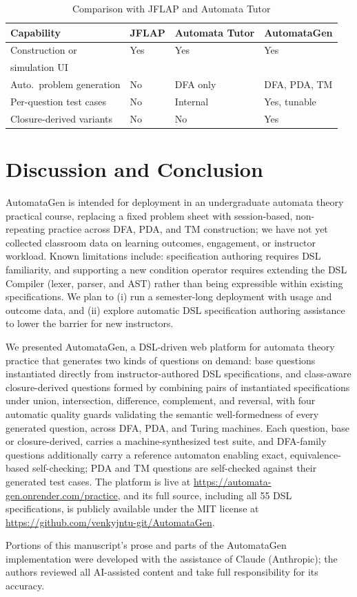 \documentclass[sigconf]{acmart}
\begin{document}
\begin{table}[t]
  \caption{Comparison with JFLAP and Automata Tutor}
  \label{tab:compare}
  \small
  \setlength{\tabcolsep}{3pt}
  \begin{tabular}{p{2.05cm}p{1.25cm}p{1.65cm}p{1.4cm}}
    \toprule
    \textbf{Capability} & \textbf{JFLAP} & \textbf{Automata Tutor} & \textbf{AutomataGen}\\
    \midrule
    Construction or  & Yes & Yes & Yes\\
    simulation UI     &    &     &    \\
    Auto.\ problem generation & No & DFA only & DFA, PDA, TM\\
    Per-question test cases & No & Internal & Yes, tunable\\
    Closure-derived variants & No & No & Yes\\
    \bottomrule
  \end{tabular}
\end{table}

\section{Discussion and Conclusion}
AutomataGen is intended for deployment in an undergraduate automata theory practical course, 
replacing a fixed problem sheet with session-based, non-repeating practice across DFA, PDA, and TM construction; 
we have not yet collected classroom data on learning outcomes, engagement, or instructor workload. 
Known limitations include: specification authoring requires DSL familiarity, and supporting a new condition operator requires extending the DSL Compiler (lexer, parser, and AST) rather than being expressible within existing specifications. We plan to (i) run a semester-long deployment with usage and outcome data, and (ii) explore automatic DSL specification authoring assistance to lower the barrier for new instructors.

We presented AutomataGen, a DSL-driven web platform for automata theory practice that generates 
two kinds of questions on demand: base questions instantiated directly from instructor-authored DSL specifications, 
and class-aware closure-derived questions formed by combining pairs of instantiated specifications under union, intersection, difference, complement, and reversal, with four automatic quality guards validating the semantic well-formedness of every generated question, across DFA, PDA, and Turing machines. 
Each question, base or closure-derived, carries a machine-synthesized test suite, and DFA-family questions additionally carry a reference automaton enabling exact, equivalence-based self-checking; PDA and TM questions are self-checked against their generated test cases. The platform is live at \url{https://automata-gen.onrender.com/practice}, 
and its full source, including all 55 DSL specifications, is publicly available under the MIT license at \url{https://github.com/venkyjntu-git/AutomataGen}.

\begin{acks}
Portions of this manuscript's prose and parts of the AutomataGen implementation were developed with the assistance of Claude (Anthropic); the authors reviewed all AI-assisted content and take full responsibility for its accuracy.
\end{acks}


\end{document}
